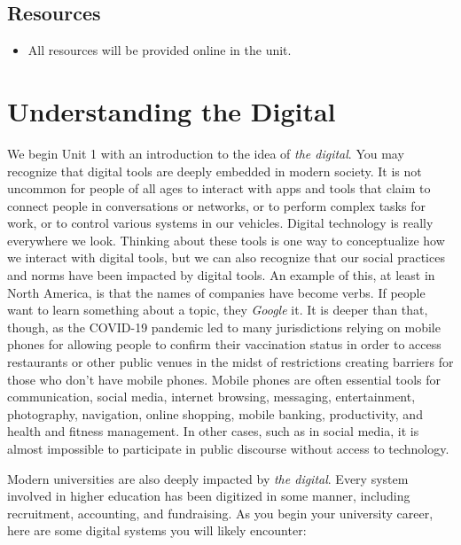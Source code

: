 \documentclass[
]{book}
\providecommand{\tightlist}{%
  \setlength{\itemsep}{0pt}\setlength{\parskip}{0pt}}
\theoremstyle{definition}
\theoremstyle{definition}
\theoremstyle{definition}
\theoremstyle{definition}
\theoremstyle{remark}
\begin{document}
\hypertarget{resources}{%
\subsection*{Resources}\label{resources}}

\begin{itemize}
\tightlist
\item
  All resources will be provided online in the unit.
\end{itemize}

\hypertarget{understanding-the-digital}{%
\section{Understanding the Digital}\label{understanding-the-digital}}

We begin Unit 1 with an introduction to the idea of \emph{the digital}. You may recognize that digital tools are deeply embedded in modern society. It is not uncommon for people of all ages to interact with apps and tools that claim to connect people in conversations or networks, or to perform complex tasks for work, or to control various systems in our vehicles. Digital technology is really everywhere we look. Thinking about these tools is one way to conceptualize how we interact with digital tools, but we can also recognize that our social practices and norms have been impacted by digital tools. An example of this, at least in North America, is that the names of companies have become verbs. If people want to learn something about a topic, they \emph{Google} it. It is deeper than that, though, as the COVID-19 pandemic led to many jurisdictions relying on mobile phones for allowing people to confirm their vaccination status in order to access restaurants or other public venues in the midst of restrictions creating barriers for those who don't have mobile phones. Mobile phones are often essential tools for communication, social media, internet browsing, messaging, entertainment, photography, navigation, online shopping, mobile banking, productivity, and health and fitness management. In other cases, such as in social media, it is almost impossible to participate in public discourse without access to technology.

Modern universities are also deeply impacted by \emph{the digital}. Every system involved in higher education has been digitized in some manner, including recruitment, accounting, and fundraising. As you begin your university career, here are some digital systems you will likely encounter:
\end{document}
